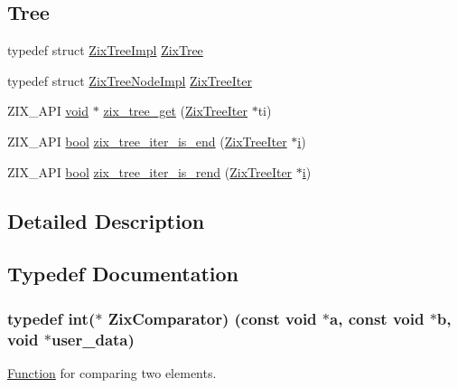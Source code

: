 \subsection*{Tree}
\begin{DoxyCompactItemize}
\item 
typedef struct \hyperlink{struct_zix_tree_impl}{Zix\+Tree\+Impl} \hyperlink{group__zix_ga684b19fdde4e1e069abd68304fa9518c}{Zix\+Tree}
\item 
typedef struct \hyperlink{struct_zix_tree_node_impl}{Zix\+Tree\+Node\+Impl} \hyperlink{group__zix_gad5034843cec6bf6ebbdc5b5fda7b112e}{Zix\+Tree\+Iter}
\item 
Z\+I\+X\+\_\+\+A\+PI \hyperlink{sound_8c_ae35f5844602719cf66324f4de2a658b3}{void} $\ast$ \hyperlink{group__zix_gafec926455f300fdb01b2ea9b5691880b}{zix\+\_\+tree\+\_\+get} (\hyperlink{group__zix_gad5034843cec6bf6ebbdc5b5fda7b112e}{Zix\+Tree\+Iter} $\ast$ti)
\item 
Z\+I\+X\+\_\+\+A\+PI \hyperlink{mac_2config_2i386_2lib-src_2libsoxr_2soxr-config_8h_abb452686968e48b67397da5f97445f5b}{bool} \hyperlink{group__zix_gab446479864f20e352e13d905340fc1b4}{zix\+\_\+tree\+\_\+iter\+\_\+is\+\_\+end} (\hyperlink{group__zix_gad5034843cec6bf6ebbdc5b5fda7b112e}{Zix\+Tree\+Iter} $\ast$\hyperlink{checksum_8c_ab80e330a3bc9e38c1297fe17381e92b4}{i})
\item 
Z\+I\+X\+\_\+\+A\+PI \hyperlink{mac_2config_2i386_2lib-src_2libsoxr_2soxr-config_8h_abb452686968e48b67397da5f97445f5b}{bool} \hyperlink{group__zix_ga2ddbf901aa3af40eb3526b995a1592a1}{zix\+\_\+tree\+\_\+iter\+\_\+is\+\_\+rend} (\hyperlink{group__zix_gad5034843cec6bf6ebbdc5b5fda7b112e}{Zix\+Tree\+Iter} $\ast$\hyperlink{checksum_8c_ab80e330a3bc9e38c1297fe17381e92b4}{i})
\end{DoxyCompactItemize}


\subsection{Detailed Description}


\subsection{Typedef Documentation}
\subsubsection[{\texorpdfstring{Zix\+Comparator}{ZixComparator}}]{\setlength{\rightskip}{0pt plus 5cm}typedef {\bf int}($\ast$ Zix\+Comparator) ({\bf const} {\bf void} $\ast${\bf a}, {\bf const} {\bf void} $\ast${\bf b}, {\bf void} $\ast$user\+\_\+data)}\hypertarget{group__zix_gaa647997c2e16e85391dad2d77c02aff6}{}\label{group__zix_gaa647997c2e16e85391dad2d77c02aff6}
\hyperlink{class_function}{Function} for comparing two elements. 

